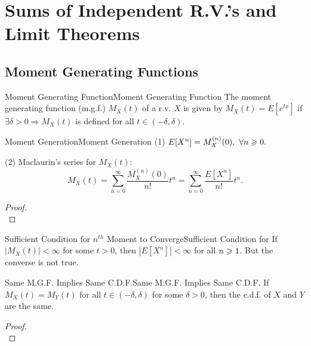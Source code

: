 \documentclass{elegantbook}
\begin{document}
\chapter{Sums of Independent R.V.'s and Limit Theorems}

\section{Moment Generating Functions}

\begin{definition}{Moment Generating Function}{Moment Generating Function}
The moment generating function (m.g.f.) \(M_{X}(t)\) of a r.v. \(X\) is
given by
\(M_{X}(t) = E[ e^{tx} ]\)
if \(\exists\delta > 0 \Rightarrow M_{X}(t)\) is def\/ined
for all \(t \in ( - \delta,\delta)\).
\end{definition}

\begin{theorem}{Moment Generation}{Moment Generation}
(1)
\(E[X^{n}] = M_{X}^{\left( n \right)}(0),\ \forall n \gs 0.\)

(2) Maclaurin's series for \(M_{X}(t)\):
\[M_{X}(t) = \sum_{n = 0}^{\infty}\frac{M_{X}^{\left( n \right)}(0)}{n!}t^{n} = \sum_{n = 0}^{\infty}\frac{E[X^{n}]}{n!}t^{n}.\]
\end{theorem}

\begin{proof}
\\[4cm]\vspace{0.01cm}
\end{proof}

\begin{remark}{Sufficient Condition for $n^{th}$ Moment to Converge}{Sufficient Condition for }
If \(\left| M_{X}(t) \right| < \infty\) for some \(t > 0\),
then \(\left| E[X^{n}] \right| < \infty\) for
all \(n \geqslant 1\). But the converse is not true.
\end{remark}

\begin{theorem}{Same M.G.F. Implies Same C.D.F.}{Same M.G.F. Implies Same C.D.F.}
If \(M_{X}(t) = M_{Y}(t)\) for all
\(t \in ( - \delta,\delta)\) for some \(\delta > 0\), then the c.d.f. of \(X\) and \(Y\) are the same.
\end{theorem}

\begin{proof}
\\[4cm]\vspace{0.01cm}
\end{proof}
\end{document}
